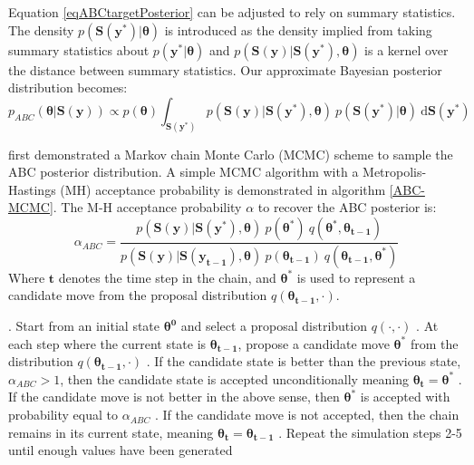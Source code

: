Equation \ref{eqABCtargetPosterior} can be adjusted to rely on summary statistics. The density $p(\bm{S}(\bm{y^*})|\bm{\theta})$ is introduced as the density implied from taking summary statistics about $p(\bm{y^*}|\bm{\theta})$ and $p(\bm{S}(\bm{y})|\bm{S}(\bm{y^*}),\bm{\theta})$ is a kernel over the distance between summary statistics. Our approximate Bayesian posterior distribution becomes:
\begin{equation}
p_{ABC}(\bm{\theta}|\bm{S}(\bm{y})) \propto p(\bm{\theta}) \int_{\bm{S}(\bm{y^*})} p(\bm{S}(\bm{y})|\bm{S}(\bm{y^*}),\bm{\theta})\  p(\bm{S}(\bm{y^*})|\bm{\theta})\ \text{d}\bm{S}(\bm{y^*})
\label{summary-stat-abc-posterior}
\end{equation}

\citet{Marjoram2003} first demonstrated a Markov chain Monte Carlo (MCMC) scheme to sample the ABC posterior distribution. A simple MCMC algorithm with a Metropolis-Hastings (MH) acceptance probability is demonstrated in algorithm \ref{ABC-MCMC}. The M-H acceptance probability $\alpha$ to recover the ABC posterior is:
\begin{equation}
\alpha_{ABC} = \frac{p(\bm{S}(\bm{y})|\bm{S}(\bm{y^*}),\bm{\theta})\ p(\bm{\theta^*})\ q(\bm{\theta^*},\bm{\theta_{t-1}})} {p(\bm{S}(\bm{y})|\bm{S}(\bm{y_{t-1}}),\bm{\theta})\ p(\bm{\theta_{t-1}})\ q(\bm{\theta_{t-1}},\bm{\theta^*})}
\label{M-H-acce}
\end{equation}
Where $\bm{t}$ denotes the time step in the chain, and $\bm{\theta^*}$ is used to represent a candidate move from the proposal distribution $q(\bm{\theta_{t-1}},\cdot)$.

\begin{algorithm}[H]
	\caption{ }
	\begin{algorithmic}
		. Start from an initial state $\bm{\theta^0}$ and select a proposal distribution $q(\cdot,\cdot)$
		. At each step where the current state is $\bm{\theta_{t-1}}$, propose a candidate 	move $\bm{\theta^*}$ from the distribution $q(\bm{\theta_{t-1}},\cdot)$		
		. If the candidate state is better than the previous state, $\alpha_{ABC} > 1$, then the candidate state is accepted unconditionally meaning $\bm{\theta_t} = \bm{\theta^*}$
		. If the candidate move is not better in the above sense, then $\bm{\theta^*}$ is accepted with probability equal to $\alpha_{ABC}$		
		. If the candidate move is not accepted, then the chain remains in its current state, meaning $\bm{\theta_{t}} = \bm{\theta_{t-1}}$		
		. Repeat the simulation steps 2-5 until enough values have been generated
	\end{algorithmic}
	\label{ABC-MCMC}
\end{algorithm}


